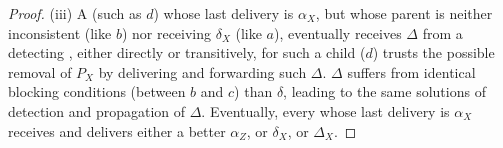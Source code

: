 \begin{proof}
  (iii) A \process (such as $d$) whose last delivery is $\alpha_X$,
  but whose parent is neither inconsistent (like $b$) nor receiving
  $\delta_X$ (like $a$), eventually receives $\Delta$ from a detecting
  \process, either directly or transitively, for such a child \process
  ($d$) trusts the possible removal of $P_X$ by delivering and
  forwarding such $\Delta$. $\Delta$ suffers from identical blocking
  conditions (between $b$ and $c$) than $\delta$, leading to the same
  solutions of detection and propagation of $\Delta$. Eventually,
  every \process whose last delivery is $\alpha_X$ receives and
  delivers either a better $\alpha_Z$, or $\delta_X$, or $\Delta_X$.

\end{proof}
